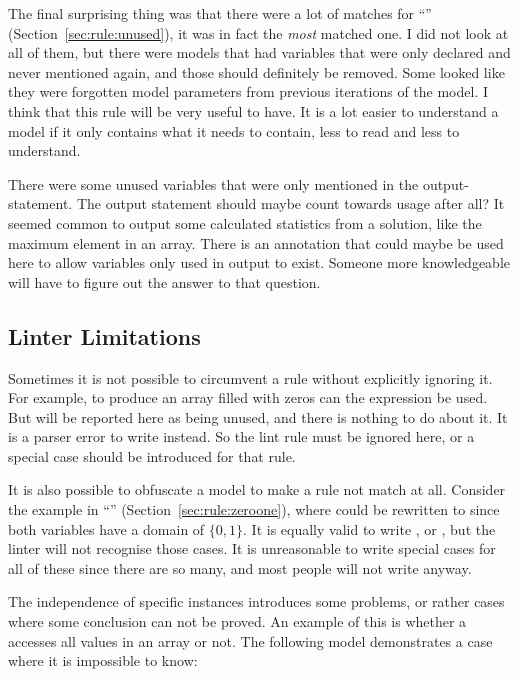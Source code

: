 \documentclass[a4paper,12pt]{article}
\newcommand{\ruleref}[1]{``\nameref{sec:rule:#1}'' (Section~\ref{sec:rule:#1})}
\begin{document}
The final surprising thing was that there were a lot of matches for \ruleref{unused},
it was in fact the \emph{most} matched one. I did not look at all of them, but
there were models that had variables that were only declared and never mentioned again,
and those should definitely be removed.
Some looked like they were forgotten model parameters from previous iterations of the model.
I think that this
rule will be very useful to have. It is a lot easier to understand a model if it only contains
what it needs to contain, less to read and less to understand.

There were some unused variables that were only mentioned in the output-statement. The
output statement should maybe count towards usage after all? It seemed common to output
some calculated statistics from a solution, like the maximum element in an array. There is
an  annotation that could maybe be used here to allow variables only used
in output to exist. Someone more knowledgeable will have to figure out the answer to that
question.

\subsection{Linter Limitations}\label{sec:disc:lintlimits}
Sometimes it is not possible to circumvent a rule without explicitly ignoring it. For
example, to produce an array filled with zeros can the expression \mzninlinebar{[0 | i in 1..k]} be
used. But  will be reported here as being unused, and there is nothing to do about
it. It is a parser error to write \mzninlinebar{[0 | \_ in 1..k]} instead. So the lint rule must be
ignored here, or a special case should be introduced for that rule.

It is also possible to obfuscate a model to make a rule not match at all. Consider
the example in \ruleref{zeroone}, where
 could be rewritten to  since both variables have a domain of
$\{0,1\}$. It is equally valid to write , or ,
but the linter will not recognise those cases. It is unreasonable to write special cases for
all of these since there are so many, and most people will not write  anyway.

The independence of specific instances introduces some problems, or rather cases where
some conclusion can not be proved.
An example of this is whether a 
accesses all values in an array or not. The following model demonstrates a case
where it is impossible to know:
\end{document}
